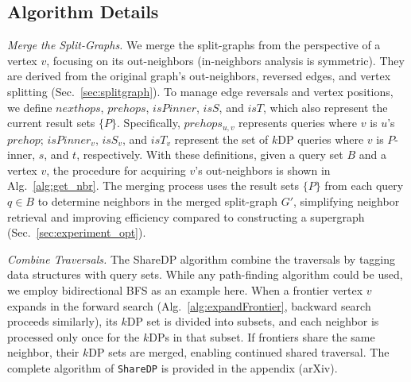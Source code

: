 \subsection{Algorithm Details} \label{sec:approach_details}

\emph{Merge the Split-Graphs.} We merge the split-graphs from the perspective of a vertex \( v \), focusing on its out-neighbors (in-neighbors analysis is symmetric). 
They are derived from the original graph’s out-neighbors, reversed edges, and vertex splitting (Sec.~\ref{sec:splitgraph}). 
To manage edge reversals and vertex positions, we define \( nexthops \), \( prehops \), \( isPinner \), \( isS \), and \( isT \), which also represent the current result sets $\{P\}$. 
Specifically, 
    \( prehops_{u,v} \) represents queries where \( v \) is \( u \)'s $prehop$; 
    \( isPinner_v \), \( isS_v \), and \( isT_v \) represent the set of $k$DP queries where \( v \) is \( P \)-inner, \( s \), and \( t \), respectively.
With these definitions, given a query set \( B \) and a vertex \( v \), the procedure for acquiring \( v \)'s out-neighbors is shown in Alg.~\ref{alg:get_nbr}. 
The merging process uses the result sets \(\{P\}\) from each query \( q \in B \) to determine neighbors in the merged split-graph \( G' \), simplifying neighbor retrieval and improving efficiency compared to constructing a supergraph (Sec.~\ref{sec:experiment_opt}).



\emph{Combine Traversals.}
The ShareDP algorithm combine the traversals by tagging data structures with query sets. 
While any path-finding algorithm could be used, we employ bidirectional BFS as an example here.
When a frontier vertex $v$ expands in the forward search (Alg.~\ref{alg:expandFrontier}, 
backward search proceeds similarly), its $k$DP set is divided into subsets, and each neighbor is processed only once for the $k$DPs in that subset.
If frontiers share the same neighbor, their $k$DP sets are merged, enabling continued shared traversal.
The complete algorithm of \texttt{ShareDP} is provided in the appendix (arXiv).




